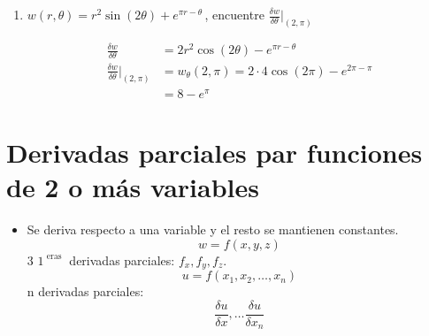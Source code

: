 \begin{enumerate}
    \item $w(r,\theta)=r^2\sin(2\theta)+e^{\pi r - \theta}\,$, encuentre $\frac{\delta w}{\delta \theta} \Big|_{(2,\pi)}^{}$
        \begin{center}
           \begin{align*}
               \frac{\delta w}{\delta \theta } &= 2r^2\cos(2\theta)-e^{\pi r -\theta} \\ 
               \frac{\delta w}{\delta \theta } \Big|_{(2,\pi)}^{} &= w_\theta(2,\pi) = 2\cdot 4\cos(2\pi)-e^{2\pi-\pi} \\ 
               &= 8-e^\pi
           \end{align*}
        \end{center}
\end{enumerate}


\section{Derivadas parciales par funciones de 2 o más variables}
\begin{itemize}
    \item Se deriva respecto a una variable y el resto se mantienen constantes.
        \[
            w = f(x,y,z) 
        \]
        3 $1^{\text{  eras  }}$ derivadas parciales: $f_x,f_y,f_z$. 
        \[
          u = f(x_1,x_2,\dots,x_n)
        \]
        n derivadas parciales: 
        \[
          \frac{\delta u }{\delta x} , \dots \frac{\delta u}{\delta x_n} 
        \]
\end{itemize}


